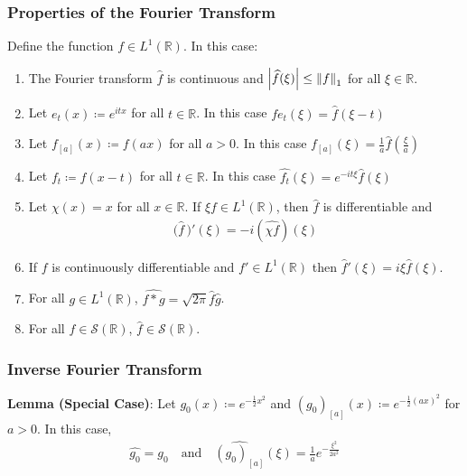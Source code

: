 \documentclass[11pt, a4paper]{article}
\newcommand{\R}{\mathbb{R}} %
\begin{document}
\subsubsection{Properties of the Fourier Transform}
Define the function $ f \in L^{1}(\R) $. In this case:
\begin{enumerate}
	\item The Fourier transform $ \widehat{f} $ is continuous and $ \abs{\widehat{f}(\xi)} \leq \norm{f}_{1} $ for all $ \xi \in \R $.
	
	\item Let $ e_{t}(x) \coloneqq e^{itx} $ for all $ t \in \R $. In this case $ \displaystyle{\widehat{fe_t}(\xi) = \widehat{f}(\xi - t)} $
	
	\item Let $ f_{[a]}(x) \coloneqq f(ax) $ for all $ a > 0 $. In this case $ \displaystyle{\widehat{f_{[a]}}(\xi) = \frac{1}{a}\widehat{f}\left(\frac{\xi}{a} \right)} $
	
	\item Let $ f_t \coloneqq f(x - t) $ for all $ t \in \R $. In this case $ \displaystyle{\widehat{f_{t}}(\xi) = e^{-it\xi} \widehat{f}(\xi)} $
	
	\item Let $ \chi(x) = x $ for all $ x \in \R $. If $ \xi f \in L^{1}(\R) $, then $ \widehat{f} $ is differentiable and 
	\begin{align*}
	\big( \widehat{f} \, \big)'(\xi) = -i \left( \widehat{\chi f}\right)(\xi)
	\end{align*}
	
	\item If $ f $ is continuously differentiable and $ f' \in L^{1}(\R) $ then $ \widehat{f}'(\xi) = i \xi \widehat{f}(\xi) $.
	
	\item For all $ g \in L^{1}(\R) $, $ \displaystyle{\widehat{f*g} = \sqrt{2\pi} \widehat{f} \widehat{g}} $.
	
	\item For all $ f \in \mathcal{S}(\R) $, $ \widehat{f} \in \mathcal{S}(\R) $.
\end{enumerate}

\subsubsection{Inverse Fourier Transform}

\textbf{Lemma (Special Case)}: Let $ g_{0}(x) \coloneqq e^{-\frac{1}{2}x^2} $ and $ (g_0)_{[a]}(x) \coloneqq e^{-\frac{1}{2}(ax)^2} $ for $ a > 0 $. In this case,
\begin{align*}
	\widehat{g_0} = g_0  \quad \text{and} \quad \widehat{(g_0)_{[a]}}(\xi) = \frac{1}{a} e^{-\frac{\xi^2}{2a^2}}
\end{align*}
\end{document}
